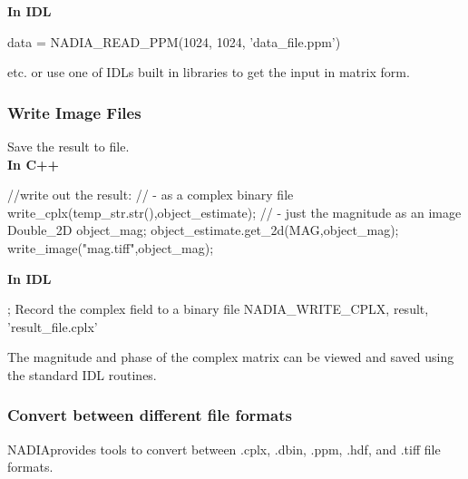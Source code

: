 \documentclass[]{nadia}
\def\name{NADIA}
\begin{document}
{\bf In IDL}
\begin{myverbatim}[language=IDL]
   data = NADIA_READ_PPM(1024, 1024, 'data_file.ppm')
\end{myverbatim}
etc. or use one of IDLs built in libraries to get
the input in matrix form.


\subsubsection{Write Image Files}
\label{subsub:write_images}
Save the result to file.\\
                          
{\bf In C++} 
\begin{myverbatim}[language=C++]
  //write out the result:
  // - as a complex binary file
  write_cplx(temp_str.str(),object_estimate);
  // - just the magnitude as an image
  Double_2D object_mag;
  object_estimate.get_2d(MAG,object_mag);
  write_image("mag.tiff",object_mag);
\end{myverbatim}
                          
{\bf In IDL}
\begin{myverbatim}[language=IDL]
  ; Record the complex field to a binary file
  NADIA_WRITE_CPLX, result, 'result_file.cplx'
\end{myverbatim}
The magnitude and phase of the complex matrix
can be viewed and saved using the standard IDL
routines.


\subsubsection{Convert between different file formats}
\name provides tools to convert between .cplx, .dbin, .ppm, .hdf, and .tiff file formats.
\end{document}
